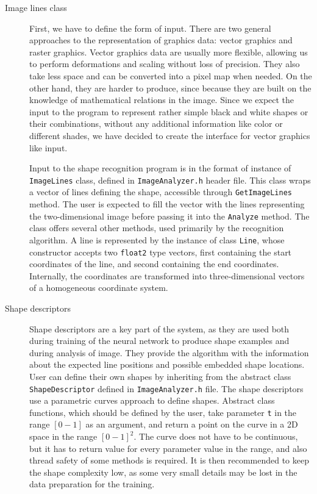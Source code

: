 \begin{description}
\item [Image lines class]
First, we have to define the form of input. There are two general approaches to the representation of graphics data: vector graphics and raster graphics. Vector graphics data are usually more flexible, allowing us to perform deformations and scaling without loss of precision. They also take less space and can be converted into a pixel map when needed. On the other hand, they are harder to produce, since because they are built on the knowledge of mathematical relations in the image. Since we expect the input to the program to represent rather simple black and white shapes or their combinations, without any additional information like color or different shades, we have decided to create the interface for vector graphics like input.

Input to the shape recognition program is in the format of instance of \texttt{ImageLines} class, defined in \texttt{ImageAnalyzer.h} header file. This class wraps a vector of lines defining the shape, accessible through \texttt{GetImageLines} method. The user is expected to fill the vector with the lines representing the two-dimensional image before passing it into the \texttt{Analyze} method. The class offers several other methods, used primarily by the recognition algorithm. 
A line is represented by the instance of class \texttt{Line}, whose constructor accepts two \texttt{float2} type vectors, first containing the start coordinates of the line, and second containing the end coordinates. Internally, the coordinates are transformed into three-dimensional vectors of a homogeneous coordinate system. 

\item [Shape descriptors]
Shape descriptors are a key part of the system, as they are used both during training of the neural network to produce shape examples and during analysis of image. They provide the algorithm with the information about the expected line positions and possible embedded shape locations. User can define their own shapes by inheriting from the abstract class \texttt{ShapeDescriptor} defined in \texttt{ImageAnalyzer.h} file. The shape descriptors use a parametric curves approach to define shapes. Abstract class functions, which should be defined by the user, take parameter \texttt{t} in the range $[0-1]$ as an argument, and return a point on the curve in a 2D space in the range $[0-1]^2$. The curve does not have to be continuous, but it has to return value for every parameter value in the range, and also thread safety of some methods is required. It is then recommended to keep the shape complexity low, as some very small details may be lost in the data preparation for the training. 


\end{description}
